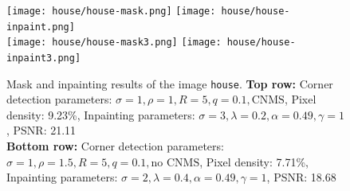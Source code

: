 \begin{figure}[ht]
    \centering
    \texttt{[image: house/house-mask.png]}
    \texttt{[image: house/house-inpaint.png]}\\\vspace*{0.2cm}
    \texttt{[image: house/house-mask3.png]}
    \texttt{[image: house/house-inpaint3.png]}
    \caption{Mask and inpainting results of the image \texttt{house}. 
        \textbf{Top row: }Corner detection parameters: $\sigma=1,\rho=1,R=5,q=0.1, \text{CNMS}$, Pixel density: 9.23\%, Inpainting parameters:
    $\sigma=3,\lambda=0.2,\alpha=0.49,\gamma=1$, PSNR\@: 21.11\\
    \textbf{Bottom row: }Corner detection parameters: $\sigma=1,\rho=1.5,R=5,q=0.1, \text{no
    CNMS}$, Pixel density: 7.71\%, Inpainting parameters:
    $\sigma=2,\lambda=0.4,\alpha=0.49,\gamma=1$, PSNR\@: 18.68}\label{fig:HouseEx}
\end{figure}
